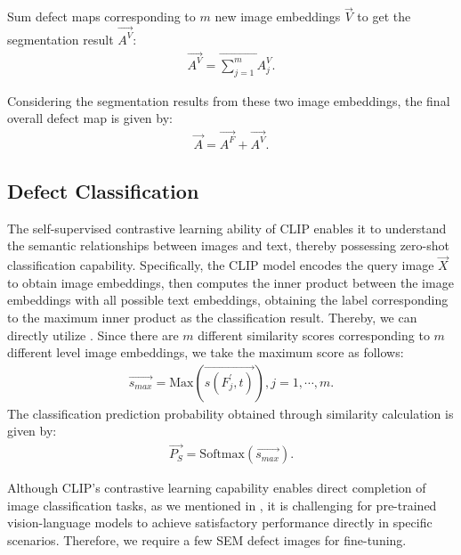 Sum defect maps corresponding to $m$ new image embeddings $\vec{V}$ to get the segmentation result $\vec{A^V}$:
\begin{align}
\vec{A^V} = \vec{\sum_{j=1}^{m} A^V_j}.
\end{align}

Considering the segmentation results from these two image embeddings, the final overall defect map is given by:
\begin{align}
\vec{A} = \vec{A^F} + \vec{A^V}.
\end{align}

\subsection{Defect Classification}
The self-supervised contrastive learning ability of CLIP \cite{radford2021learning} enables it to understand the semantic relationships between images and text, thereby possessing zero-shot classification capability.
Specifically, the CLIP model encodes the query image $\vec{X}$ to obtain image embeddings, then computes the inner product between the image embeddings with all possible text embeddings, obtaining the label corresponding to the maximum inner product as the classification result. Thereby, we can directly utilize . Since there are $m$ different similarity scores corresponding to $m$ different level image embeddings, we take the maximum score as follows:
\begin{align}
\vec{s_{max}} = \text{Max}(\vec{s(F_{j}^{'}, t)}),  j=1, \cdots, m.
\end{align}
The classification prediction probability obtained through similarity calculation is given by:
\begin{align}
\vec{P_{S}}= \text{Softmax}(\vec{s_{max}}).
\end{align}

Although CLIP's contrastive learning capability enables direct completion of image classification tasks, as we mentioned in , it is challenging for pre-trained vision-language models to achieve satisfactory performance directly in specific scenarios. Therefore, we require a few SEM defect images for fine-tuning.

